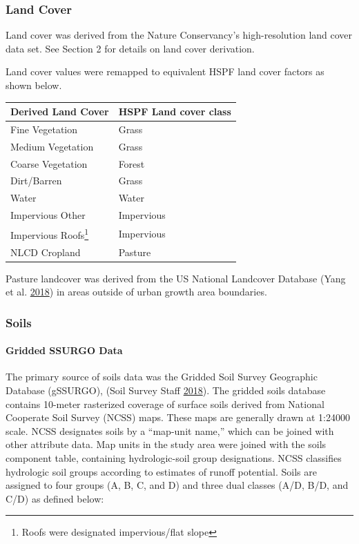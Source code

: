 \documentclass[
]{report}
\begin{document}
\hypertarget{land-cover}{%
\subsubsection{Land Cover}\label{land-cover}}

Land cover was derived from the Nature Conservancy's high-resolution land cover data set. See Section 2 for details on land cover derivation.

Land cover values were remapped to equivalent HSPF land cover factors as shown below.

\begin{longtable}[]{@{}ll@{}}
\toprule
Derived Land Cover & HSPF Land cover class\tabularnewline
\midrule
\endhead
Fine Vegetation & Grass\tabularnewline
Medium Vegetation & Grass\tabularnewline
Coarse Vegetation & Forest\tabularnewline
Dirt/Barren & Grass\tabularnewline
Water & Water\tabularnewline
Impervious Other & Impervious\tabularnewline
Impervious Roofs\footnote{Roofs were designated impervious/flat slope} & Impervious\tabularnewline
NLCD Cropland & Pasture\tabularnewline
\bottomrule
\end{longtable}

Pasture landcover was derived from the US National Landcover Database (Yang et al. \protect\hyperlink{ref-yang2018new}{2018}) in areas outside of urban growth area boundaries.

\hypertarget{soils}{%
\subsubsection{Soils}\label{soils}}

\hypertarget{gridded-ssurgo-data}{%
\paragraph{Gridded SSURGO Data}\label{gridded-ssurgo-data}}

The primary source of soils data was the Gridded Soil Survey Geographic Database (gSSURGO), (Soil Survey Staff \protect\hyperlink{ref-SoilSurveyStaff2018}{2018}). The gridded soils database contains 10-meter rasterized coverage of surface soils derived from National Cooperate Soil Survey (NCSS) maps. These maps are generally drawn at 1:24000 scale. NCSS designates soils by a ``map-unit name,'' which can be joined with other attribute data. Map units in the study area were joined with the soils component table, containing hydrologic-soil group designations. NCSS classifies hydrologic soil groups according to estimates of runoff potential. Soils are assigned to four groups (A, B, C, and D) and three dual classes (A/D, B/D, and C/D) as defined below:
\end{document}
